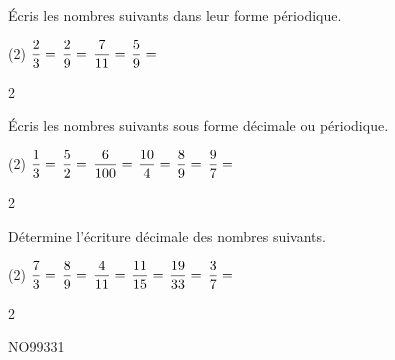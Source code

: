 \documentclass[a4paper,11pt]{report}
\begin{document}
\begin{exo}{
Écris les nombres suivants dans leur forme périodique.
\begin{tasks}(2)
    \task $\dfrac{2}{3}=\hrulefill$\hspace{0.5cm}
    \task $\dfrac{2}{9}=\hrulefill$
    \task $\dfrac{7}{11}=\hrulefill$\hspace{0.5cm}
    \task $\dfrac{5}{9}=\hrulefill$
\end{tasks}
 \vspace{1pt}

}{2}\end{exo}

\begin{exo}{
Écris les nombres suivants sous forme décimale ou périodique.
\begin{tasks}(2)
    \task $\dfrac{1}{3}=\hrulefill$\hspace{0.5cm}
    \task $\dfrac{5}{2}=\hrulefill$
    \task $\dfrac{6}{100}=\hrulefill$\hspace{0.5cm}
    \task $\dfrac{10}{4}=\hrulefill$
    \task $\dfrac{8}{9}=\hrulefill$\hspace{0.5cm}
    \task $\dfrac{9}{7}=\hrulefill$
\end{tasks}
 \vspace{1pt}

}{2}\end{exo}


\begin{exop}{
Détermine l'écriture décimale des nombres suivants.
\begin{tasks}(2)
    \task $\dfrac{7}{3}=\hrulefill$\hspace{0.5cm}
    \task $\dfrac{8}{9}=\hrulefill$
    \task $\dfrac{4}{11}=\hrulefill$\hspace{0.5cm}
    \task $\dfrac{11}{15}=\hrulefill$
    \task $\dfrac{19}{33}=\hrulefill$\hspace{0.5cm}
    \task $\dfrac{3}{7}=\hrulefill$
\end{tasks}
 \vspace{1pt}

}{2}\end{exop}

\begin{exof}{NO99}{33}{1}
\end{exof}
\end{document}
